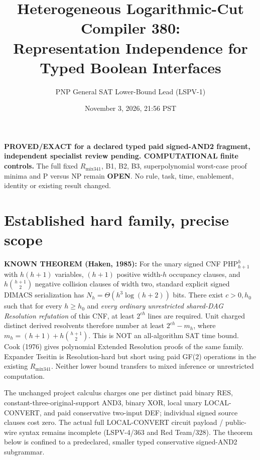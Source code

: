 \documentclass[11pt]{article}
\title{Heterogeneous Logarithmic-Cut Compiler 380:\\
Representation Independence for Typed Boolean Interfaces}
\author{PNP General SAT Lower-Bound Lead (LSPV-1)}
\date{November 3, 2026, 21:56 PST}
\begin{document}
\maketitle
\noindent\textbf{PROVED/EXACT for a declared typed paid signed-AND2 fragment, independent specialist review pending. COMPUTATIONAL finite controls.} The full fixed $R_{\mathrm{mix341}}$, B1, B2, B3, superpolynomial worst-case proof minima and P versus NP remain \textbf{OPEN}. No rule, task, time, enablement, identity or existing result changed.

\section*{Established hard family, precise scope}
\noindent\textbf{KNOWN THEOREM (Haken, 1985):} For the unary signed CNF $\mathrm{PHP}_{h+1}^h$ with $h(h+1)$ variables, $(h+1)$ positive width-$h$ occupancy clauses, and $h\binom{h+1}{2}$ negative collision clauses of width two, standard explicit signed DIMACS serialization has $N_h=\Theta(h^3\log(h+2))$ bits. There exist $c>0,h_0$ such that for every $h\ge h_0$ and \emph{every ordinary unrestricted shared-DAG Resolution refutation} of this CNF, at least $2^{ch}$ lines are required. Unit charged distinct derived resolvents therefore number at least $2^{ch}-m_h$, where $m_h=(h+1)+h\binom{h+1}{2}$. This is NOT an all-algorithm SAT time bound. Cook (1976) gives polynomial Extended Resolution proofs of the same family. Expander Tseitin is Resolution-hard but short using paid GF(2) operations in the existing $R_{\mathrm{mix341}}$. Neither lower bound transfers to mixed inference or unrestricted computation.

\noindent The unchanged project calculus charges one per distinct paid binary RES, constant-three-original-support AND3, binary XOR, local unary LOCAL-CONVERT, and paid conservative two-input DEF; individual signed source clauses cost zero. The actual full LOCAL-CONVERT circuit payload / public-wire syntax remains incomplete (LSPV-4/363 and Red Team/328). The theorem below is confined to a predeclared, smaller typed conservative signed-AND2 subgrammar.
\end{document}
